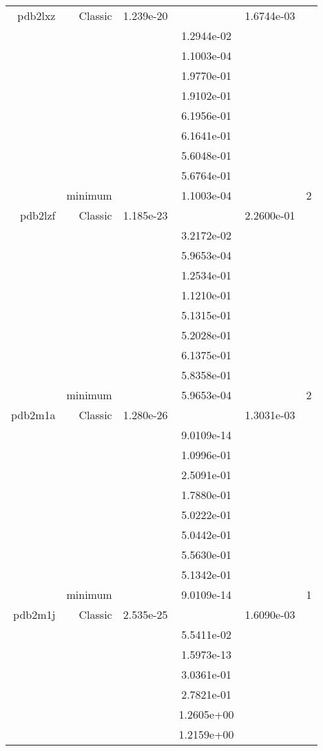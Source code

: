 \begin{xltabular}{\textwidth}{r|rS[table-format=1.3e+2]S[table-format=1.4e+2]S[table-format=1.4e+2]S[table-format=-1.5]}
pdb2lxz & Classic & 1.239e-20 &  & 1.6744e-03 & \\
&  &  & 1.2944e-02 & & \\
&  &  & 1.1003e-04 & & \\
&  &  & 1.9770e-01 & & \\
&  &  & 1.9102e-01 & & \\
&  &  & 6.1956e-01 & & \\
&  &  & 6.1641e-01 & & \\
&  &  & 5.6048e-01 & & \\
&  &  & 5.6764e-01 & & \\
& minimum &  & 1.1003e-04 & & 2 \\  \addlinespace
pdb2lzf & Classic & 1.185e-23 &  & 2.2600e-01 & \\
&  &  & 3.2172e-02 & & \\
&  &  & 5.9653e-04 & & \\
&  &  & 1.2534e-01 & & \\
&  &  & 1.1210e-01 & & \\
&  &  & 5.1315e-01 & & \\
&  &  & 5.2028e-01 & & \\
&  &  & 6.1375e-01 & & \\
&  &  & 5.8358e-01 & & \\
& minimum &  & 5.9653e-04 & & 2 \\  \addlinespace
pdb2m1a & Classic & 1.280e-26 &  & 1.3031e-03 & \\
&  &  & 9.0109e-14 & & \\
&  &  & 1.0996e-01 & & \\
&  &  & 2.5091e-01 & & \\
&  &  & 1.7880e-01 & & \\
&  &  & 5.0222e-01 & & \\
&  &  & 5.0442e-01 & & \\
&  &  & 5.5630e-01 & & \\
&  &  & 5.1342e-01 & & \\
& minimum &  & 9.0109e-14 & & 1 \\  \addlinespace
pdb2m1j & Classic & 2.535e-25 &  & 1.6090e-03 & \\
&  &  & 5.5411e-02 & & \\
&  &  & 1.5973e-13 & & \\
&  &  & 3.0361e-01 & & \\
&  &  & 2.7821e-01 & & \\
&  &  & 1.2605e+00 & & \\
&  &  & 1.2159e+00 & & \\

\end{xltabular}
